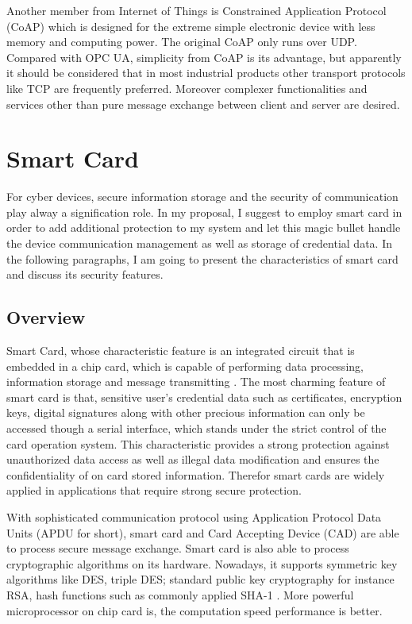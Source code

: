 Another member from Internet of Things is Constrained Application Protocol (CoAP) \cite{Ref5} which is designed for the extreme simple electronic device with less memory and computing power. The original CoAP only runs over UDP. Compared with OPC UA, simplicity from CoAP is its advantage, but apparently it should be considered that in most industrial products other transport protocols like TCP are frequently preferred. Moreover complexer functionalities and services other than pure message exchange between client and server are desired.

\section{Smart Card} \label{secSmartCard}
For cyber devices, secure information storage and the security of communication play alway a signification role. In my proposal, I suggest to employ smart card in order to add additional protection to my system and let this magic bullet handle the device communication management as well as storage of credential data. In the following paragraphs, I am going to present the characteristics of smart card and discuss its security features.
\subsection{Overview}
Smart Card, whose characteristic feature is an integrated circuit that is embedded in a chip card, which is capable of performing data processing, information storage and message transmitting \cite{handbuch}. The most charming feature of smart card is that, sensitive user's credential data such as certificates, encryption keys, digital signatures along with other precious information can only be accessed though a serial interface, which stands under the strict control of the card operation system. This characteristic provides a strong protection against  unauthorized data access as well as illegal data modification and ensures the confidentiality of on card stored information. Therefor smart cards are widely applied in applications that require strong secure protection.

With sophisticated communication protocol using Application Protocol Data Units (APDU for short), smart card and Card Accepting Device (CAD) are able to process secure message exchange. Smart card is also able to process cryptographic algorithms on its hardware. Nowadays, it supports symmetric key algorithms like DES, triple DES; standard public key cryptography for instance RSA, hash functions such as commonly applied SHA-1 \cite{handbuch}. More powerful microprocessor on chip card is, the computation speed performance is better.  

